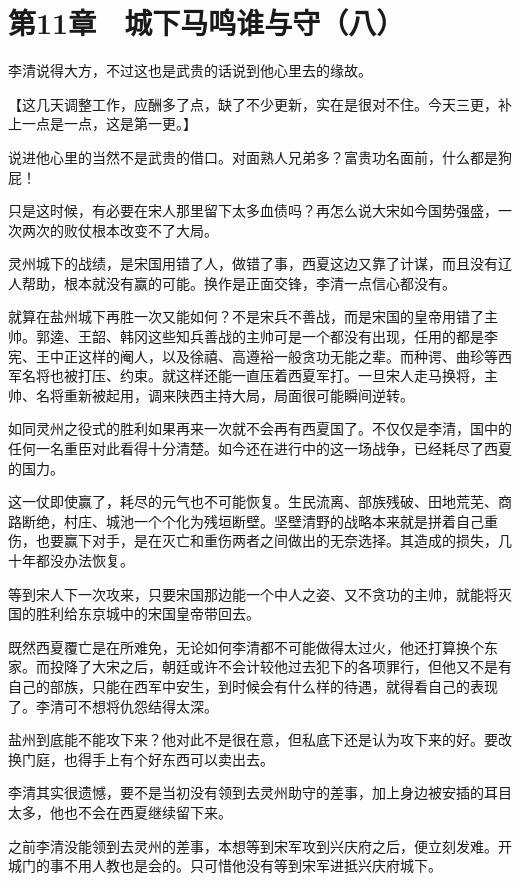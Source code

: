 \section{第11章　城下马鸣谁与守（八）}

李清说得大方，不过这也是武贵的话说到他心里去的缘故。

【这几天调整工作，应酬多了点，缺了不少更新，实在是很对不住。今天三更，补上一点是一点，这是第一更。】

说进他心里的当然不是武贵的借口。对面熟人兄弟多？富贵功名面前，什么都是狗屁！

只是这时候，有必要在宋人那里留下太多血债吗？再怎么说大宋如今国势强盛，一次两次的败仗根本改变不了大局。

灵州城下的战绩，是宋国用错了人，做错了事，西夏这边又靠了计谋，而且没有辽人帮助，根本就没有赢的可能。换作是正面交锋，李清一点信心都没有。

就算在盐州城下再胜一次又能如何？不是宋兵不善战，而是宋国的皇帝用错了主帅。郭逵、王韶、韩冈这些知兵善战的主帅可是一个都没有出现，任用的都是李宪、王中正这样的阉人，以及徐禧、高遵裕一般贪功无能之辈。而种谔、曲珍等西军名将也被打压、约束。就这样还能一直压着西夏军打。一旦宋人走马换将，主帅、名将重新被起用，调来陕西主持大局，局面很可能瞬间逆转。

如同灵州之役式的胜利如果再来一次就不会再有西夏国了。不仅仅是李清，国中的任何一名重臣对此看得十分清楚。如今还在进行中的这一场战争，已经耗尽了西夏的国力。

这一仗即使赢了，耗尽的元气也不可能恢复。生民流离、部族残破、田地荒芜、商路断绝，村庄、城池一个个化为残垣断壁。坚壁清野的战略本来就是拼着自己重伤，也要赢下对手，是在灭亡和重伤两者之间做出的无奈选择。其造成的损失，几十年都没办法恢复。

等到宋人下一次攻来，只要宋国那边能一个中人之姿、又不贪功的主帅，就能将灭国的胜利给东京城中的宋国皇帝带回去。

既然西夏覆亡是在所难免，无论如何李清都不可能做得太过火，他还打算换个东家。而投降了大宋之后，朝廷或许不会计较他过去犯下的各项罪行，但他又不是有自己的部族，只能在西军中安生，到时候会有什么样的待遇，就得看自己的表现了。李清可不想将仇怨结得太深。

盐州到底能不能攻下来？他对此不是很在意，但私底下还是认为攻下来的好。要改换门庭，也得手上有个好东西可以卖出去。

李清其实很遗憾，要不是当初没有领到去灵州助守的差事，加上身边被安插的耳目太多，他也不会在西夏继续留下来。

之前李清没能领到去灵州的差事，本想等到宋军攻到兴庆府之后，便立刻发难。开城门的事不用人教也是会的。只可惜他没有等到宋军进抵兴庆府城下。

